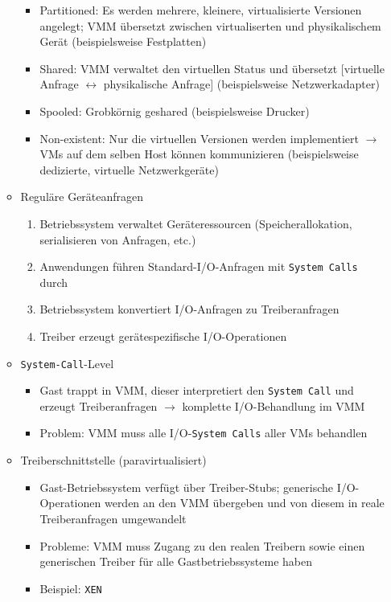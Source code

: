 \begin{itemize}
\begin{itemize}
\begin{itemize}
			\item Partitioned: Es werden mehrere, kleinere, virtualisierte Versionen angelegt; VMM übersetzt zwischen virtualiserten und physikalischem Gerät (beispielsweise Festplatten)
			\item Shared: VMM verwaltet den virtuellen Status und übersetzt [virtuelle Anfrage \(\leftrightarrow\) physikalische Anfrage] (beispielsweise Netzwerkadapter)
			\item Spooled: Grobkörnig geshared (beispielsweise Drucker)
			\item Non-existent: Nur die virtuellen Versionen werden implementiert \(\rightarrow\) VMs auf dem selben Host können kommunizieren (beispielsweise dedizierte, virtuelle Netzwerkgeräte)
		\end{itemize}
		\item Reguläre Geräteanfragen
		\begin{enumerate}
			\item Betriebssystem verwaltet Geräteressourcen (Speicherallokation, serialisieren von Anfragen, etc.)
			\item Anwendungen führen Standard-I/O-Anfragen mit \texttt{System Calls} durch
			\item Betriebssystem konvertiert I/O-Anfragen zu Treiberanfragen
			\item Treiber erzeugt gerätespezifische I/O-Operationen
		\end{enumerate}
		\item \texttt{System-Call}-Level
		\begin{itemize}
			\item Gast trappt in VMM, dieser interpretiert den \texttt{System Call} und erzeugt Treiberanfragen \(\rightarrow\) komplette I/O-Behandlung im VMM
			\item Problem: VMM muss alle I/O-\texttt{System Calls} aller VMs behandlen
		\end{itemize}
		\item Treiberschnittstelle (paravirtualisiert)
		\begin{itemize}
			\item Gast-Betriebssystem verfügt über Treiber-Stubs; generische I/O-Operationen werden an den VMM übergeben und von diesem in reale Treiberanfragen umgewandelt
			\item Probleme: VMM muss Zugang zu den realen Treibern sowie einen generischen Treiber für alle Gastbetriebssysteme haben
			\item Beispiel: \texttt{XEN}
		\end{itemize}
	\end{itemize}
\end{itemize}
